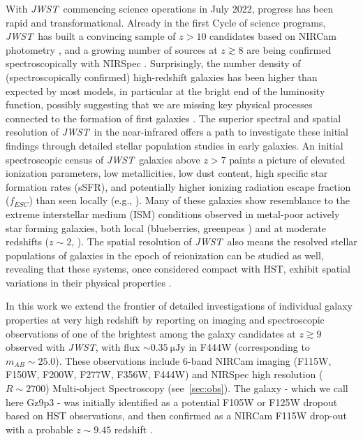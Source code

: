 \documentclass[sn-mathphys]{sn-jnl}%
\theoremstyle{thmstyleone}%
\theoremstyle{thmstyletwo}%
\theoremstyle{thmstylethree}%
\newcommand{\jwst}{\textit{JWST}}
\begin{document}
With \jwst\ commencing science operations in July 2022, progress has been rapid and transformational. Already in the first Cycle of science programs, \jwst\ has built a convincing sample of $z>10$ candidates based on NIRCam photometry \citep{Castellano2022,naidu22,Donnan23,Harikane23,MorishitaStiavelli2022,Bouwens22}, and a growing number of sources at $z\gtrsim 8$ are being confirmed spectroscopically with NIRSpec \citep{Morishita22, Roberts-Borsani22b, Curtis-lake22, Bunker23}. Surprisingly, the number density of (spectroscopically confirmed) high-redshift galaxies has been higher than expected by most models, in particular at the bright end of the luminosity function, possibly suggesting that we are missing key physical processes connected to the formation of first galaxies \citep{Mason2023,Wilkins23}. 
The superior spectral and spatial resolution of \jwst\ in the near-infrared offers a path to investigate these initial findings through detailed stellar population studies in early galaxies. An initial spectroscopic census of \jwst\ galaxies above $z>7$ paints a picture of elevated ionization parameters, low metallicities, low dust content, high specific star formation rates (sSFR), and potentially higher ionizing radiation escape fraction ($f_{ESC}$) than seen locally (e.g., \cite{Katz23, Curti23, Hsiao2022, Cameron23, Endsley22arxiv, Tang23, Sanders23}). Many of these galaxies show resemblance to the extreme interstellar medium (ISM) conditions observed in metal-poor actively star forming galaxies, both local (blueberries, greenpeas \citep{Cardamone09, Yang17, Henry15, Jaskot13}) and at moderate redshifts ($z\sim2$, \citep{Tang21, Sanders20, Sanders_2015}). The spatial resolution of \jwst\, also means the resolved stellar populations of galaxies in the epoch of reionization can be studied as well, revealing that these systems, once considered compact with HST, exhibit spatial variations in their physical properties \citep{Wang22b, Chen23, Gimenez-Arteaga22}. 

In this work we extend the frontier of detailed investigations of individual galaxy properties at very high redshift by reporting on imaging and spectroscopic observations of one of the brightest among the galaxy candidates at $z\gtrsim 9$ observed with \jwst, with flux $\sim 0.35~\mathrm{\mu Jy}$ in F444W (corresponding to $m_{AB}\sim 25.0$). These observations include 6-band NIRCam imaging (F115W, F150W, F200W, F277W, F356W, F444W) and NIRSpec high resolution ($R\sim2700$) Multi-object Spectroscopy (see~\ref{sec:obs}). The galaxy - which we call here Gz9p3 - was initially identified as a potential F105W or F125W dropout based on HST observations, and then confirmed as a NIRCam F115W drop-out with a probable $z\sim 9.45$ redshift \citep{Castellano22b}. 
\end{document}
